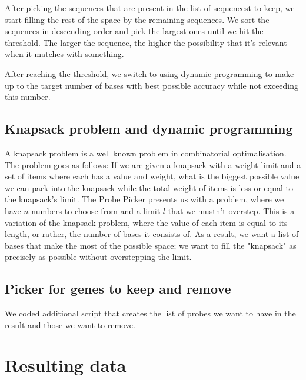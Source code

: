 After picking the sequences that are present in the list of sequencest to keep, we start filling the rest of the space by the remaining sequences. We sort the 
sequences in descending order and pick the largest ones until we hit the threshold. The larger the sequence, the higher the possibility that it's relevant 
when it matches with something. 

After reaching the threshold, we switch to using dynamic programming to make up to the target number of bases with best possible accuracy while not exceeding this 
number. 

\subsection{Knapsack problem and dynamic programming}
A knapsack problem is a well known problem in combinatorial optimalisation. The problem goes as follows: If we are given a knapsack with a weight limit and a 
set of items where each has a value and weight, what is the biggest possible value we can pack into the knapsack while the total weight of items is less or equal to 
the knapsack's limit. 
The Probe Picker presents us with a problem, where we have $n$ numbers to choose from and a limit $l$ that we mustn't overstep. This is a variation of the knapsack problem, 
where the value of each item is equal to its length, or rather, the number of bases it consists of. As a result, we want a list of bases that make the most of the possible space; 
we want to fill the "knapsack" as precisely as possible without overstepping the limit. 



\subsection{Picker for genes to keep and remove}
We coded additional script that creates the list of probes we want to have in the result and those we want to remove. 

\section{Resulting data}


